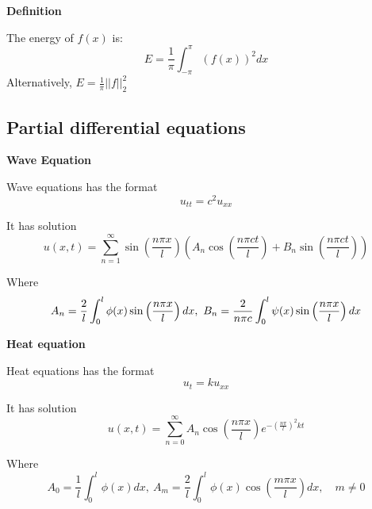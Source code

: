 \documentclass[11pt]{article}
\begin{document}
\textbf{Definition}

The energy of $f(x)$ is:
$$E=\frac{1}{\pi} \int_{-\pi}^{\pi}(f(x))^{2} d x$$
Alternatively, $E=\frac{1}{\pi} ||f ||_{2}^{2}$

\newpage

\subsection{Partial differential equations}
\textbf{Wave Equation}

Wave equations has the format
$$u_{tt} = c^2u_{xx}$$

It has solution 
$$u(x, t)=\sum_{n=1}^{\infty} \sin \left(\frac{n \pi x}{l}\right)\left(A_{n} \cos \left(\frac{n \pi c t}{l}\right)+B_{n} \sin \left(\frac{n \pi c t}{l}\right)\right)$$

Where 
$$A_{n}=\frac{2}{l} \int_{0}^{l} \phi(x) \sin \left(\frac{n \pi x}{l}\right)dx,~ B_{n}=\frac{2}{n \pi c} \int_{0}^{l} \psi(x) \sin \left(\frac{n \pi x}{l}\right)dx\\$$


\textbf{Heat equation}

Heat equations has the format
$$u_t = ku_{xx}$$

It has solution
$$u(x, t)=\sum_{n=0}^{\infty} A_{n} \cos \left(\frac{n \pi x}{l}\right) e^{-\left(\frac{n \pi}{l}\right)^{2} k t}$$

Where
$$A_{0}=\frac{1}{l} \int_{0}^{l} \phi(x)dx,~A_{m}=\frac{2}{l} \int_{0}^{l} \phi(x) \cos \left(\frac{m \pi x}{l}\right)dx,\quad m\neq 0$$
\end{document}
